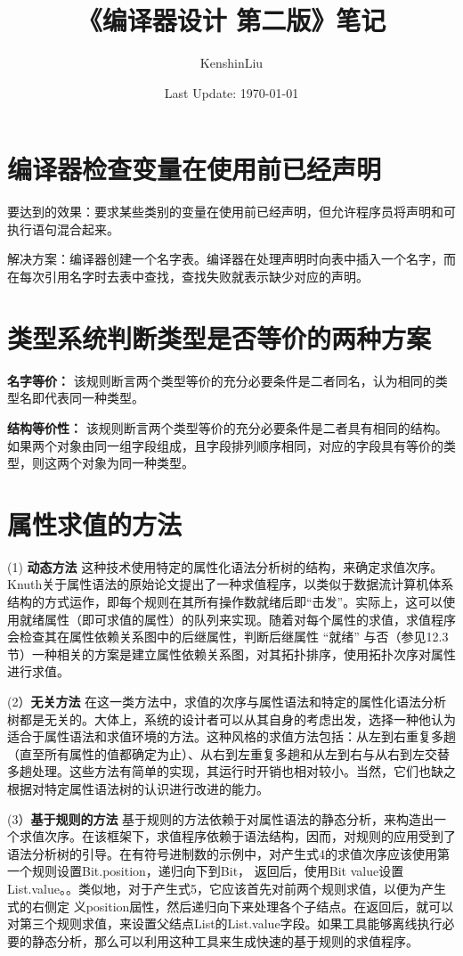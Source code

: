 \documentclass[12pt]{article}
\title{《编译器设计 第二版》笔记}
\author{KenshinLiu}
\date{Last Update: \today}                                           %
\begin{document}
\maketitle
\newpage

\section*{编译器检查变量在使用前已经声明}

要达到的效果：要求某些类别的变量在使用前已经声明，但允许程序员将声明和可执行语句混合起来。

解决方案：编译器创建一个名字表。编译器在处理声明时向表中插入一个名字，而在每次引用名字时去表中查找，查找失败就表示缺少对应的声明。


\section*{类型系统判断类型是否等价的两种方案}

\textbf{名字等价：} 该规则断言两个类型等价的充分必要条件是二者同名，认为相同的类型名即代表同一种类型。

\textbf{结构等价性：} 该规则断言两个类型等价的充分必要条件是二者具有相同的结构。如果两个对象由同一组字段组成，且字段排列顺序相同，对应的字段具有等价的类型，则这两个对象为同一种类型。

\section*{属性求值的方法}

(1) \textbf{动态方法} 这种技术使用特定的属性化语法分析树的结构，来确定求值次序。Knuth关于属性语法的原始论文提出了一种求值程序，以类似于数据流计算机体系结构的方式运作，即每个规则在其所有操作数就绪后即“击发”。实际上，这可以使用就绪属性（即可求值的属性）的队列来实现。随着对每个属性的求值，求值程序会检查其在属性依赖关系图中的后继属性，判断后继属性 “就绪” 与否（参见12.3节）一种相关的方案是建立属性依赖关系图，对其拓扑排序，使用拓扑次序对属性进行求值。

(2）\textbf{无关方法} 在这一类方法中，求值的次序与属性语法和特定的属性化语法分析树都是无关的。大体上，系统的设计者可以从其自身的考虑出发，选择一种他认为适合于属性语法和求值环境的方法。这种风格的求值方法包括：从左到右重复多趟（直至所有属性的值都确定为止）、从右到左重复多趟和从左到右与从右到左交替多趟处理。这些方法有简单的实现，其运行时开销也相对较小。当然，它们也缺之根据对特定属性语法树的认识进行改进的能力。

(3）\textbf{基于规则的方法} 基于规则的方法依赖于对属性语法的静态分析，来构造出一个求值次序。在该框架下，求值程序依赖于语法结构，因而，对规则的应用受到了语法分析树的引导。在有符号进制数的示例中，对产生式4的求值次序应该使用第一个规则设置Bit.position，递归向下到Bit， 返回后，使用Bit value设置List.value。。类似地，对于产生式5，它应该首先对前两个规则求值，以便为产生式的右侧定 义position屆性，然后递归向下来处理各个子结点。在返回后，就可以对第三个规则求值，来设置父结点List的List.value字段。如果工具能够离线执行必要的静态分析，那么可以利用这种工具来生成快速的基于规则的求值程序。
\end{document}
